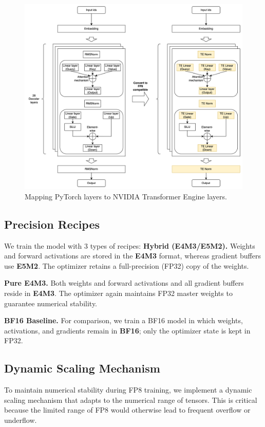\begin{figure}[h]
    \centering
    \includegraphics[width=\linewidth]{figures/c3/conversation.drawio.png}
    \caption{Mapping PyTorch layers to NVIDIA Transformer Engine layers.}
    \label{fig:te_conversion}
\end{figure}

\subsection{Precision Recipes}\label{sec:precision_recipes}
We train the model with 3 types of recipes:
\textbf{Hybrid (E4M3/E5M2).}
Weights and forward activations are stored in the \textbf{E4M3} format, whereas gradient buffers use \textbf{E5M2}. The optimizer retains a full-precision (FP32) copy of the weights.

\textbf{Pure E4M3.}
Both weights and forward activations and all gradient buffers reside in \textbf{E4M3}. The optimizer again maintains FP32 master weights to guarantee numerical stability.

\textbf{BF16 Baseline.}
For comparison, we train a BF16 model in which weights, activations, and gradients remain in \textbf{BF16}; only the optimizer state is kept in FP32.

\subsection{Dynamic Scaling Mechanism}
To maintain numerical stability during FP8 training, we implement a dynamic scaling mechanism that adapts to the numerical range of tensors. This is critical because the limited range of FP8 would otherwise lead to frequent overflow or underflow.

